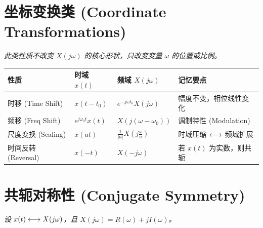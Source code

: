 \section{坐标变换类 (Coordinate Transformations)}
\textit{此类性质不改变 $X(j\omega)$ 的核心形状，只改变变量 $\omega$ 的位置或比例。}

\begin{table}[h!]
    \centering
    \renewcommand{\arraystretch}{1.5}
    \begin{tabularx}{\textwidth}{@{} l l L l @{}}
        \toprule
        \textbf{性质} & \textbf{时域} $x(t)$ & \textbf{频域} $X(j\omega)$ & \textbf{记忆要点} \\
        \midrule
       
 时移 (Time Shift) & $x(t-t_0)$ & $e^{-j\omega t_0}X(j\omega)$ & 幅度不变，相位线性变化 \\
        频移 (Freq Shift) & $e^{j\omega_0 t}x(t)$ & $X(j(\omega-\omega_0))$ & 调制特性 (Modulation) \\
        尺度变换 (Scaling) & $x(at)$ & $\frac{1}{|a|}X(j\frac{\omega}{a})$ & 时域压缩 $\longleftrightarrow$ 频域扩展 \\
        时间反转 (Reversal) & $x(-t)$ & $X(-j\omega)$ & 若 $x(t)$ 为实数，则共轭 \\
        \bottomrule
    \end{tabularx}
\end{table}

\section{共轭对称性 (Conjugate Symmetry)}
\textit{设 $x(t) \longleftrightarrow X(j\omega)$，且 $X(j\omega) = R(\omega) + jI(\omega)$。}

